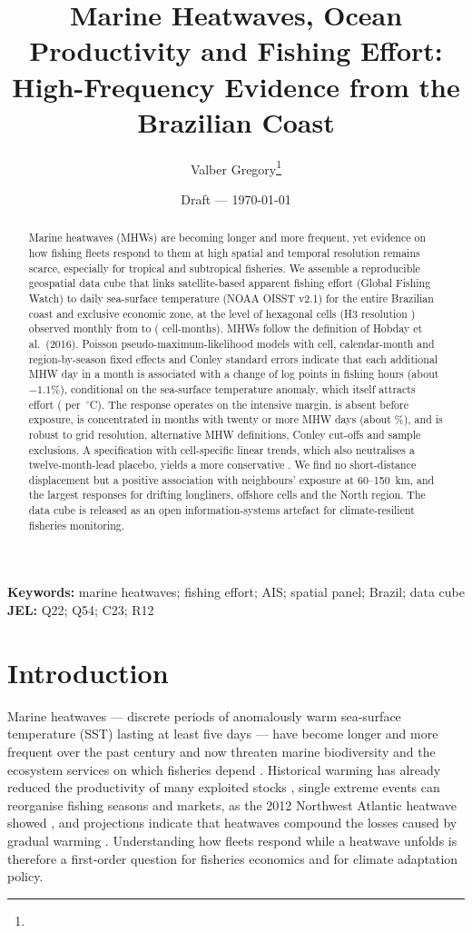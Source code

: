 \documentclass[12pt,a4paper]{article}
\title{Marine Heatwaves, Ocean Productivity and Fishing Effort:\\
High-Frequency Evidence from the Brazilian Coast}
\author{Valber Gregory\thanks{%
}}
\date{Draft — \today}
\begin{document}
\maketitle

\begin{abstract}
Marine heatwaves (MHWs) are becoming longer and more frequent, yet evidence on how fishing fleets respond to them at high spatial and temporal resolution remains scarce, especially for tropical and subtropical fisheries. We assemble a reproducible geospatial data cube that links satellite-based apparent fishing effort (Global Fishing Watch) to daily sea-surface temperature (NOAA OISST v2.1) for the entire Brazilian coast and exclusive economic zone, at the level of \panelCells{} hexagonal cells (H3 resolution \gridRes{}) observed monthly from \panelStart{} to \panelEnd{} (\panelObs{} cell-months). MHWs follow the definition of Hobday et al.\ (2016). Poisson pseudo-maximum-likelihood models with cell, calendar-month and region-by-season fixed effects and Conley standard errors indicate that each additional MHW day in a month is associated with a change of \bMhwMain{} log points in fishing hours (about $-1.1\%$), conditional on the sea-surface temperature anomaly, which itself attracts effort (\bSstAnom{} per~$^{\circ}$C). The response operates on the intensive margin, is absent before exposure, is concentrated in months with twenty or more MHW days (about \pctBinTwentyPlus{}\%), and is robust to grid resolution, alternative MHW definitions, Conley cut-offs and sample exclusions. A specification with cell-specific linear trends, which also neutralises a twelve-month-lead placebo, yields a more conservative \bMhwCellTrend{}. We find no short-distance displacement but a positive association with neighbours' exposure at 60--150~km, and the largest responses for drifting longliners, offshore cells and the North region. The data cube is released as an open information-systems artefact for climate-resilient fisheries monitoring.
\end{abstract}

\noindent\textbf{Keywords:} marine heatwaves; fishing effort; AIS; spatial panel; Brazil; data cube\\
\noindent\textbf{JEL:} Q22; Q54; C23; R12

\section{Introduction}\label{sec:intro}
Marine heatwaves --- discrete periods of anomalously warm sea-surface temperature (SST) lasting at least five days \citep{hobday2016} --- have become longer and more frequent over the past century \citep{oliver2018} and now threaten marine biodiversity and the ecosystem services on which fisheries depend \citep{smale2019}. Historical warming has already reduced the productivity of many exploited stocks \citep{free2019}, single extreme events can reorganise fishing seasons and markets, as the 2012 Northwest Atlantic heatwave showed \citep{mills2013}, and projections indicate that heatwaves compound the losses caused by gradual warming \citep{cheung2020}. Understanding how fleets respond while a heatwave unfolds is therefore a first-order question for fisheries economics and for climate adaptation policy.
\end{document}
